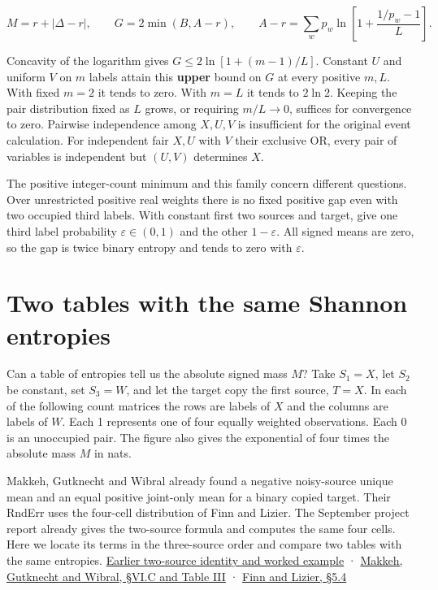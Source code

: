 \[
M=r+|\Delta-r|,\qquad G=2\min(B,A-r),\qquad
A-r=\sum_w p_w\ln\!\left[1+\frac{1/p_w-1}{L}\right].
\]

Concavity of the logarithm gives \(G\leq 2\ln[1+(m-1)/L]\). Constant \(U\) and uniform \(V\) on \(m\) labels attain this \textbf{upper} bound on \(G\) at every positive \(m,L\). With fixed \(m=2\) it tends to zero. With \(m=L\) it tends to \(2\ln 2\). Keeping the pair distribution fixed as \(L\) grows, or requiring \(m/L\to0\), suffices for convergence to zero. Pairwise independence among \(X,U,V\) is insufficient for the original event calculation. For independent fair \(X,U\) with \(V\) their exclusive OR, every pair of variables is independent but \((U,V)\) determines \(X\).

The positive integer-count minimum and this family concern different questions. Over unrestricted positive real weights there is no fixed positive gap even with two occupied third labels. With constant first two sources and target, give one third label probability \(\varepsilon\in(0,1)\) and the other \(1-\varepsilon\). All signed means are zero, so the gap is twice binary entropy and tends to zero with \(\varepsilon\).

\clearpage

\section{Two tables with the same Shannon entropies}\label{two-tables-with-the-same-shannon-entropies}

Can a table of entropies tell us the absolute signed mass \(M\)? Take \(S_1=X\), let \(S_2\) be constant, set \(S_3=W\), and let the target copy the first source, \(T=X\). In each of the following count matrices the rows are labels of \(X\) and the columns are labels of \(W\). Each 1 represents one of four equally weighted observations. Each 0 is an unoccupied pair. The figure also gives the exponential of four times the absolute mass \(M\) in nats.

Makkeh, Gutknecht and Wibral already found a negative noisy-source unique mean and an equal positive joint-only mean for a binary copied target. Their RndErr uses the four-cell distribution of Finn and Lizier. The September project report already gives the two-source formula and computes the same four cells. Here we locate its terms in the three-source order and compare two tables with the same entropies. \href{https://github.com/sepahead/pid-rs/blob/6a9f087be84bc21a89ff51e7da8e626e6883d73e/audit/evidence/finite-target-copy-mgw-synergy.md}{Earlier two-source identity and worked example} · \href{https://arxiv.org/pdf/2002.03356v5\#page=11}{Makkeh, Gutknecht and Wibral, §VI.C and Table III} · \href{https://doi.org/10.3390/e20040297}{Finn and Lizier, §5.4}

